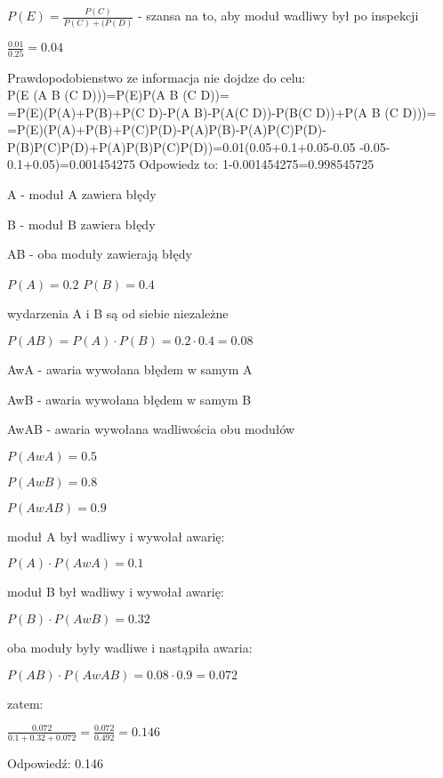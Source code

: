 \documentclass[fleqn]{article}
\begin{document}
$P(E) = \frac{P(C)}{P(C)+(P(D)}$ - szansa na to, aby moduł wadliwy był po inspekcji

$\frac{0.01}{0.25} = 0.04$


\medskip
{}
\medskip
Prawdopodobienstwo ze informacja nie dojdze do celu:\\
P(E \cap (A \cup B \cup (C \cap D)))=P(E)P(A \cup B \cup (C \cap D))=\\=P(E)(P(A)+P(B)+P(C \cap D)-P(A \cap B)-P(A\cap (C \cap D))-P(B\cap (C \cap D))+P(A \cap B \cap (C \cap D)))=\\=P(E)(P(A)+P(B)+P(C)P(D)-P(A)P(B)-P(A)P(C)P(D)-P(B)P(C)P(D)+P(A)P(B)P(C)P(D))=0.01\cdot (0.05+0.1+0.05-0.05 -0.05-0.1+0.05)=0.001454275
Odpowiedz to: 1-0.001454275=0.998545725
\newpage
\medskip
{}
\medskip

A - moduł A zawiera błędy

B - moduł B zawiera błędy

AB - oba moduły zawierają błędy

$P(A) = 0.2$
$P(B) = 0.4$

wydarzenia A i B są od siebie niezależne

$P(AB) = P(A) \cdot P(B) = 0.2 \cdot 0.4 = 0.08$

AwA - awaria wywołana błędem w samym A

AwB - awaria wywołana błędem w samym B

AwAB - awaria wywołana wadliwościa obu modułów

$P(AwA) = 0.5$

$P(AwB) = 0.8$

$P(AwAB) = 0.9$

moduł A był wadliwy i wywołał awarię:

$P(A) \cdot P(AwA) = 0.1$

moduł B był wadliwy i wywołał awarię:

$P(B) \cdot P(AwB) = 0.32$

oba moduły były wadliwe i nastąpiła awaria:

$ P(AB) \cdot P(AwAB) = 0.08 \cdot 0.9 = 0.072$

zatem:

$\frac{0.072}{0.1 + 0.32 + 0.072} = \frac{0.072}{0.492} = 0.146$

Odpowiedź: 0.146

\medskip


 \\
\end{document}
